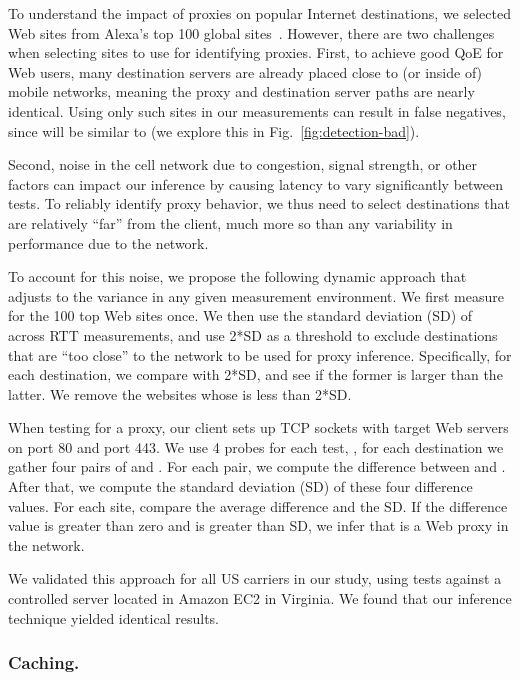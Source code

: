 To understand the impact of proxies on popular Internet destinations, we selected Web sites from Alexa's top 100 global sites~\cite{topweb}. However, there are two challenges when selecting sites to use for identifying proxies. First, to achieve good QoE for Web users, many destination servers are already placed close to (or inside of) mobile networks, meaning the proxy and destination server paths are nearly identical. Using only such sites in our measurements can result in false negatives, since  will be similar to  (we explore this in Fig.~\ref{fig:detection-bad}). 

Second, noise in the cell network due to congestion, signal strength, or other factors can impact our inference by causing latency to vary significantly between tests. To reliably identify proxy behavior, we thus need to select destinations that are relatively ``far'' from the client, much more so than any variability in performance due to the network. 

To account for this noise, we propose the following dynamic approach that adjusts to the variance in any given measurement environment. We first measure    for the 100 top Web sites once. We then use the standard deviation (SD) of across RTT measurements, and use 2*SD as a threshold to exclude destinations that are ``too close'' to the network to be used for proxy inference. Specifically, for each destination, we compare  with 2*SD, and see if the former is larger than the latter. We remove the websites whose  is less than 2*SD.

When testing for a proxy, our client sets up TCP sockets with target Web servers on port 80 and port 443.  We use 4 probes for each test, \ie, for each destination we gather four pairs of  and . For each pair, we compute the difference between  and . After that, we compute the standard deviation (SD) of these four difference values. For each site, compare the average difference and the SD. If the difference value is greater than zero and is greater than SD, we infer that is a Web proxy in the network. 

We validated this approach for all US carriers in our study, using tests against a controlled server located in Amazon EC2 in Virginia. We found that our inference technique yielded identical results.

\vspace{-1em}
\subsubsection{Caching.}

